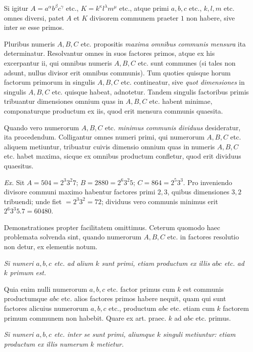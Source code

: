 Si igitur $A=a^\alpha b^\beta c^\gamma$ etc., $K=k^\kappa l^\lambda m^{\mu}$ etc., atque primi $a, b, c$ etc., $k, l, m$ etc. omnes diversi, patet $A$ et $K$ divisorem communem praeter $1$ non habere, sive inter se esse primos.

Pluribus numeris $A, B, C$ etc. propositis \emph{maxima omnibus communis mensura} ita determinatur. Resolvantur omnes in suos factores primos, atque ex his excerpantur ii, qui omnibus numeris $A, B, C$ etc. sunt communes (si tales non adsunt, nullus divisor erit omnibus communis). Tum quoties quisque horum factorum primorum in singulis $A, B, C$ etc. contineatur, sive \emph{quot dimensiones} in singulis $A, B, C$ etc. quisque habeat, adnotetur. Tandem singulis factoribus primis tribuantur dimensiones omnium quas in $A, B, C$ etc. habent minimae, componaturque productum ex iis, quod erit mensura communis quaesita.

Quando vero numerorum $A, B, C$ etc. \emph{minimus communis dividuus} desideratur, ita procedendum. Colligantur omnes numeri primi, qui numerorum $A, B, C$ etc. aliquem metiuntur, tribuatur cuivis dimensio omnium quas in numeris $A, B, C$ etc. habet maxima, sicque ex omnibus productum confletur, quod erit dividuus quaesitus.

\emph{Ex.} Sit $A=504=2^3 3^2 7$; $B=2880=2^6 3^2 5$; $C=864=2^5 3^3$. Pro inveniendo divisore communi maximo habentur factores primi $2, 3$, quibus dimensiones $3, 2$ tribuendi; unde fiet $=2^3 3^2=72$; dividuus vero communis minimus erit $2^6 3^3 5.7=60480$.

Demonstrationes propter facilitatem omittimus. Ceterum quomodo haec problemata solvenda sint, quando numerorum $A, B, C$ etc. in factores resolutio non detur, ex elementis notum.

\emph{Si numeri $a, b, c$ etc. ad alium $k$ sunt primi, etiam productum ex illis $abc$ etc. ad $k$ primum est.}

Quia enim nulli numerorum $a, b, c$ etc. factor primus cum $k$ est communis productumque $abc$ etc. alios factores primos habere nequit, quam qui sunt factores alicuius numerorum $a, b, c$ etc., productum $abc$ etc. etiam cum $k$ factorem primum communem non habebit. Quare ex art. praec. $k$ ad $abc$ etc. primus.

\emph{Si numeri $a, b, c$ etc. inter se sunt primi, aliumque $k$ singuli metiuntur: etiam productum ex illis numerum $k$ metietur.}

